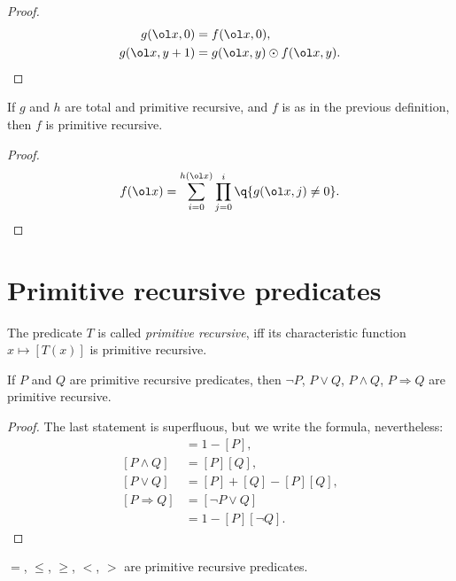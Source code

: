 \begin{proof}
  \begin{align*}
    g(\ol x, 0) &= f(\ol x, 0), \\
    g(\ol x, y+1) &= g(\ol x, y) \odot f(\ol x, y).
  \end{align*}
\end{proof}

\begin{statement}
  If $g$ and $h$ are total and primitive recursive, and $f$ is as in the previous definition, then $f$ is primitive recursive.
\end{statement}

\begin{proof}
  $$ f(\ol x) = \sum_{i=0}^{h(\ol x)} \prod_{j=0}^i \q{ g(\ol x, j) \ne 0 }. $$
\end{proof}

\section{Primitive recursive predicates}

\begin{definition}
  The predicate $T$ is called \emph{primitive recursive}, iff its characteristic function $x \mapsto [T(x)]$ is primitive recursive. 
\end{definition}

\begin{proposition}
  If $P$ and $Q$ are primitive recursive predicates, then
  $\neg P$,
  $P \lor Q$, $P \land Q$, $P \Rightarrow Q$ are primitive recursive. 
\end{proposition}

\begin{proof}
  The last statement is superfluous, but we write the formula, nevertheless:
  \begin{align*}
    [\neg P] &= 1-[P], \\
    [P \land Q] &= [P] [Q], \\
    [P \lor Q] &= [P] + [Q] - [P][Q], \\
    [P \Rightarrow Q] &= [\neg P \lor Q] \\
    &= 1-[P][\neg Q].
  \end{align*}
\end{proof}

\begin{proposition}
  $=$, $\le$, $\ge$, $<$, $>$ are primitive recursive predicates.
\end{proposition}

